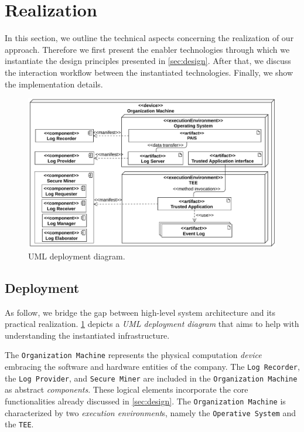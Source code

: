 \section{Realization}
\label{sec:implementation}
In this section,
we outline the technical aspects concerning the realization of our approach. Therefore we first present the enabler technologies through which we instantiate the design principles presented in \cref{sec:design}. After that, we discuss the interaction workflow between the instantiated technologies. Finally, we show the implementation details.
\begin{figure}[t]
\centering
\includegraphics[width=10.5  cm]{content/figures/deployment_diagram.pdf}
\caption{UML deployment diagram.}
\label{fig:deployment_diagram}
\end{figure}
\subsection{Deployment}
As follow, we bridge the gap between high-level system architecture and its practical realization. \cref{fig:deployment_diagram} depicts a \textit{UML deployment diagram} \cite{koch2002expressive} that aims to help with understanding the instantiated infrastructure. 

The \texttt{Organization Machine} represents the physical computation \textit{device} embracing the software and hardware entities of the company. The \texttt{Log Recorder}, the \texttt{Log Provider}, and \texttt{Secure Miner} are included in the \texttt{Organization Machine} as abstract \textit{components}. These logical elements incorporate the core functionalities already discussed in \cref{sec:design}. The \texttt{Organization Machine} is characterized by two \textit{execution environment}s, namely the \texttt{Operative System} and the \texttt{TEE}.

